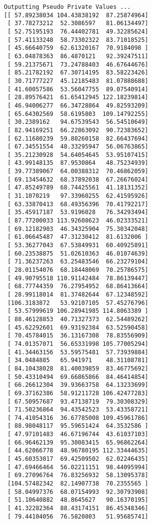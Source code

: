 \documentclass{article}
\begin{document}
\begin{lstlisting}
Outputting Pseudo Private Values ...
[[ 57.89238034 104.43838192  87.25874964]
 [ 37.78273212  52.3086597   81.06134497]
 [ 52.75195193  76.44402781  49.32285624]
 [ 57.41133248  58.73302322  83.71018525]
 [ 45.66640759  62.61320167  70.9184098 ]
 [ 63.04878363  86.4870121   92.39247511]
 [ 59.21375671  73.24788403  46.67644676]
 [ 85.21782192  67.30714195  83.58223426]
 [ 30.71777227  45.12185483  81.07888688]
 [ 41.60057586  53.56047755  89.07540914]
 [ 28.89576421  61.65412945 122.18239814]
 [ 46.94006277  66.34728864  49.82593209]
 [ 65.64302569  58.6195803  109.14792255]
 [ 30.2389162   94.67539543  56.54510649]
 [ 82.94169251  66.22863092  90.72383652]
 [ 62.11680239  59.80260158  82.66437694]
 [ 67.34551554  48.33295947  56.06763865]
 [ 35.21230928  54.64054645  53.95107415]
 [ 43.99148135  87.9530864   48.75234939]
 [ 39.77389067  64.00388312  70.46862059]
 [ 69.13454632  68.37892038  67.26676024]
 [ 47.85249789  68.74425561  41.18131352]
 [ 31.1070219   97.33960255  62.41595926]
 [ 63.33870413  68.49356396  70.41792217]
 [ 35.45917187  53.9196028   76.34293494]
 [ 87.77200033 113.92608623  46.02333521]
 [ 69.12182903  46.34325904  75.30342048]
 [ 61.06645487  47.31230412  81.6132006 ]
 [ 53.36277043  67.53849931  60.40925891]
 [ 60.23538875  51.02610363  46.01074639]
 [ 71.36237263  63.25483546  66.23279104]
 [ 28.01154076  68.18448069  70.25786575]
 [ 49.90795518 110.91142484  78.86139447]
 [ 68.77744359  76.27954952  68.86413664]
 [ 28.99118014  81.37482644  67.12348592]
 [106.3183872   53.92107105  57.45276796]
 [ 53.57999619 106.28941985 114.8063389 ]
 [ 88.46128853  40.71327373  62.54489262]
 [ 45.62292601  69.93192384  63.52590458]
 [ 70.45784015  36.13167308  78.83556909]
 [ 74.01357071  56.65331998 105.77005294]
 [ 41.34463156  53.59575481  57.73939884]
 [ 34.0484885   65.941971    48.31108781]
 [ 84.10438028  81.40039859  83.46775692]
 [ 50.43310494  69.66865866  84.46414854]
 [ 66.26612304  39.93663758  64.13233699]
 [ 69.37162386  58.91211728 106.42477283]
 [ 67.50957687  93.47138719  79.30308329]
 [ 71.50236864  94.43542523  53.43358721]
 [ 74.41054316  36.67785008 109.45961786]
 [ 88.98048117  95.59651424  64.3532586 ]
 [ 47.97101483  46.67196744  43.61037103]
 [ 66.96462139  95.30083415  65.96862264]
 [ 44.62066778  48.96780195 112.33444635]
 [ 45.60353017  69.42509502  62.02246435]
 [ 47.69466464  56.02211151  98.44095994]
 [ 69.27096764  76.83256932  58.13095378]
 [104.57482342  82.14907738  70.2355565 ]
 [ 58.04997376  68.07154993  92.30793908]
 [ 51.10640882  48.8645627   90.16370195]
 [ 41.32282364  88.43174151  86.45348346]
 [ 79.44104056  76.5820803   51.95685741]

\end{lstlisting}
\end{document}
